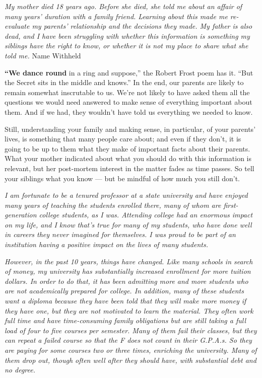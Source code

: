 \emph{My mother died 18 years ago. Before she died, she told me about an
affair of many years' duration with a family friend. Learning about this
made me re-evaluate my parents' relationship and the decisions they
made. My father is also dead, and I have been struggling with whether
this information is something my siblings have the right to know, or
whether it is not my place to share what she told me.} Name Withheld

\textbf{``We dance round} in a ring and suppose,'' the Robert Frost poem
has it. ``But the Secret sits in the middle and knows.'' In the end, our
parents are likely to remain somewhat inscrutable to us. We're not
likely to have asked them all the questions we would need answered to
make sense of everything important about them. And if we had, they
wouldn't have told us everything we needed to know.

Still, understanding your family and making sense, in particular, of
your parents' lives, is something that many people care about; and even
if they don't, it is going to be up to them what they make of important
facts about their parents. What your mother indicated about what you
should do with this information is relevant, but her post-mortem
interest in the matter fades as time passes. So tell your siblings what
you know --- but be mindful of how much you still don't.

\emph{I am fortunate to be a tenured professor at a state university and
have enjoyed many years of teaching the students enrolled there, many of
whom are first-generation college students, as I was. Attending college
had an enormous impact on my life, and I know that's true for many of my
students, who have done well in careers they never imagined for
themselves. I was proud to be part of an institution having a positive
impact on the lives of many students.}

\emph{However, in the past 10 years, things have changed. Like many
schools in search of money, my university has substantially increased
enrollment for more tuition dollars. In order to do that, it has been
admitting more and more students who are not academically prepared for
college. In addition, many of these students want a diploma because they
have been told that they will make more money if they have one, but they
are not motivated to learn the material. They often work full time and
have time-consuming family obligations but are still taking a full load
of four to five courses per semester. Many of them fail their classes,
but they can repeat a failed course so that the F does not count in
their G.P.A.s. So they are paying for some courses two or three times,
enriching the university. Many of them drop out, though often well after
they should have, with substantial debt and no degree.}

